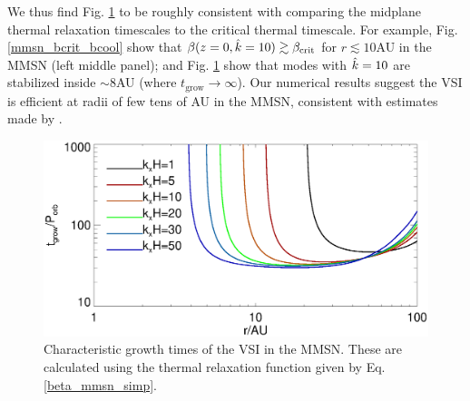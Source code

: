 
We thus find Fig. \ref{mmsn_overall} to be roughly consistent with
comparing the midplane thermal relaxation timescales to the critical
thermal timescale. For example, 
Fig. \ref{mmsn_bcrit_bcool} show that $\beta(z=0,\hat{k}=10) \gtrsim
\beta_\mathrm{crit}$ for $r\lesssim 10$AU in the MMSN (left middle
panel); and Fig. \ref{mmsn_overall} 
show that modes with $\hat{k}=10$ are stabilized inside $\sim 8$AU (where
$t_\mathrm{grow}\to\infty$). Our numerical results suggest the VSI
is efficient at radii of few tens of AU in the MMSN, consistent with
estimates made by . 

\begin{figure}
  \includegraphics[width=\linewidth]{figures/eigen_compare_grow.ps}
  \caption{Characteristic growth times of the VSI in 
    the MMSN. These are calculated using the thermal relaxation
    function given by Eq. \ref{beta_mmsn_simp}. 
    \label{mmsn_overall}}    
\end{figure}
